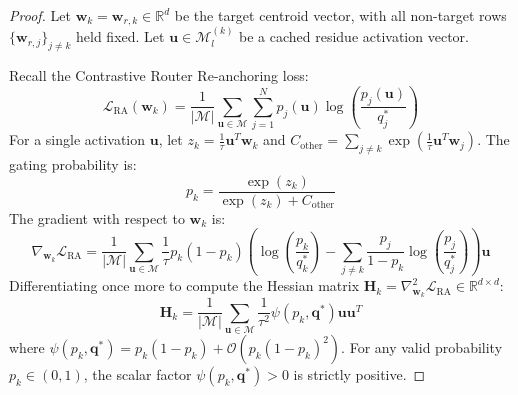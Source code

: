 \documentclass{article}
\theoremstyle{definition}
\begin{document}
\begin{proof}
Let $\mathbf{w}_k = \mathbf{w}_{r, k} \in \mathbb{R}^d$ be the target centroid vector, with all non-target rows $\{\mathbf{w}_{r, j}\}_{j \neq k}$ held fixed. Let $\mathbf{u} \in \mathcal{M}_l^{(k)}$ be a cached residue activation vector. 

Recall the Contrastive Router Re-anchoring loss:
\begin{equation}
\mathcal{L}_{\text{RA}}(\mathbf{w}_k) = \frac{1}{|\mathcal{M}|} \sum_{\mathbf{u} \in \mathcal{M}} \sum_{j=1}^N p_j(\mathbf{u}) \log\left(\frac{p_j(\mathbf{u})}{q_j^*}\right)
\end{equation}
For a single activation $\mathbf{u}$, let $z_k = \frac{1}{\tau} \mathbf{u}^T \mathbf{w}_k$ and $C_{\text{other}} = \sum_{j \neq k} \exp(\frac{1}{\tau} \mathbf{u}^T \mathbf{w}_j)$. The gating probability is:
\begin{equation}
p_k = \frac{\exp(z_k)}{\exp(z_k) + C_{\text{other}}}
\end{equation}
The gradient with respect to $\mathbf{w}_k$ is:
\begin{equation}
\nabla_{\mathbf{w}_k} \mathcal{L}_{\text{RA}} = \frac{1}{|\mathcal{M}|} \sum_{\mathbf{u} \in \mathcal{M}} \frac{1}{\tau} p_k (1 - p_k) \left( \log\left(\frac{p_k}{q_k^*}\right) - \sum_{j \neq k} \frac{p_j}{1 - p_k} \log\left(\frac{p_j}{q_j^*}\right) \right) \mathbf{u}
\end{equation}
Differentiating once more to compute the Hessian matrix $\mathbf{H}_k = \nabla_{\mathbf{w}_k}^2 \mathcal{L}_{\text{RA}} \in \mathbb{R}^{d \times d}$:
\begin{equation}
\mathbf{H}_k = \frac{1}{|\mathcal{M}|} \sum_{\mathbf{u} \in \mathcal{M}} \frac{1}{\tau^2} \psi(p_k, \mathbf{q}^*) \mathbf{u} \mathbf{u}^T
\end{equation}
where $\psi(p_k, \mathbf{q}^*) = p_k(1 - p_k) + \mathcal{O}(p_k(1-p_k)^2)$. For any valid probability $p_k \in (0, 1)$, the scalar factor $\psi(p_k, \mathbf{q}^*) > 0$ is strictly positive.


\end{proof}
\end{document}
